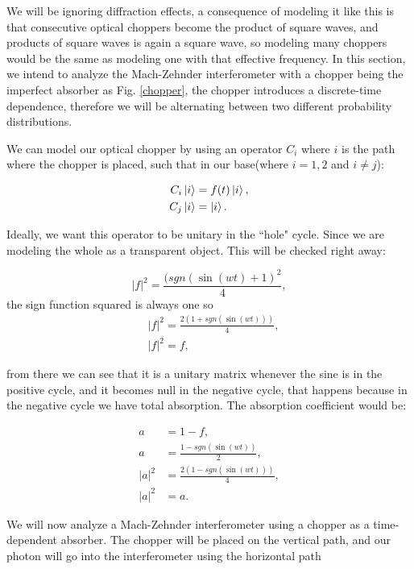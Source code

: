 \documentclass{book}
\begin{document}
We will be ignoring diffraction effects, a consequence of modeling it like this is that consecutive optical choppers become the product of square waves, and products of square waves is again a square wave, so modeling many choppers would be the same as modeling one with that effective frequency. In this section, we intend to analyze the Mach-Zehnder interferometer with a chopper being the imperfect absorber as Fig. \ref{chopper}, the chopper introduces a discrete-time dependence, therefore we will be alternating between two different probability distributions.


We can model our optical chopper by using an operator $C_{i}$ where $i$ is the path where the chopper is placed, such that in our base(where $i=1,2$ and $i \neq j$):

\begin{align}
C_{i}\ket{i}&=f(t)\ket{i},\\
C_{j}\ket{i}&=\ket{i}.
\end{align}

Ideally, we want this operator to be unitary in the ``hole" cycle. Since we are modeling the whole as a transparent object. This will be checked right away:

\begin{equation}
|f|^2=\frac{(sgn(\sin(wt)+1)^2}{4},
\end{equation}
the sign function squared is always one so
\begin{align}
&|f|^2=\frac{2(1+sgn(\sin(wt)))}{4}, \\
&|f|^2=f,
\end{align}


from there we can see that it is a unitary matrix whenever the sine is in the positive cycle, and it becomes null in the negative cycle, that happens because in the negative cycle we have total absorption. The absorption coefficient would  be:  

\begin{align}
 a&=1-f,\\
 a&=\frac{1-sgn(\sin(wt))}{2},\\
|a|^2&=\frac{2(1-sgn(\sin(wt)))}{4},\\
|a|^2&=a.
\end{align}

We will now analyze a Mach-Zehnder interferometer using a chopper as a time-dependent absorber. The chopper will be placed on the vertical path, and our photon will go into the interferometer using the horizontal path
\end{document}

